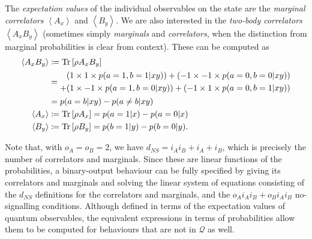 \documentclass[10pt, a4paper]{article}
\numberwithin{equation}{section} %
\theoremstyle{definition}
\theoremstyle{plain}
\newcommand{\?}{\mathrel{?}} %
\newcommand{\angleb}[1]{\left\langle #1 \right\rangle} %
\newcommand{\Tr}[2][]{\mathop{\mathrm{Tr}#1}\left[ #2 \right]} %
\newcommand{\Qs}{\mathcal{Q}}
\begin{document}
    The \emph{expectation values} of the individual observables on the state are the \emph{marginal correlators}  \(\angleb{A_x}\) and \(\angleb{B_y}\). We are also interested in the \emph{two-body correlators} \(\angleb{A_x B_y}\) (sometimes simply \emph{marginals} and \emph{correlators}, when the distinction from marginal probabilities is clear from context). These can be computed as
    \begin{align}
      \angleb{A_x B_y} &\coloneqq \Tr{\rho{A_x B_y}} \\
                       &= \begin{aligned}[c]
                         (1 \times 1 \times p(a=1,b=1|xy)) + (-1 \times -1 \times p(a=0,b=0|xy)) \\
                         + (1 \times -1 \times p(a=1,b=0|xy)) + (-1 \times 1 \times p(a=0,b=1|xy))
                       \end{aligned} \notag \\
                       &= p(a=b|xy) - p(a\neq b|xy) \\
      \angleb{A_x} &\coloneqq \Tr{\rho{A_x}} = p(a=1|x) - p(a=0|x) \\
      \angleb{B_y} &\coloneqq \Tr{\rho{B_y}} = p(b=1|y) - p(b=0|y).
    \end{align}

    Note that, with \(o_A = o_B = 2\), we have \(d_{NS} = {i_A}{i_B} + i_A + i_B\), which is precisely the number of correlators and marginals. Since these are linear functions of the probabilities, a binary-output behaviour can be fully specified by giving its correlators and marginals and solving the linear system of equations consisting of the \(d_{NS}\) definitions for the correlators and marginals, and the \(o_A i_A i_B + o_B i_A i_B\) no-signalling conditions. Although defined in terms of the expectation values of quantum observables, the equivalent expressions in terms of probabilities allow them to be computed for behaviours that are not in \(\Qs\) as well.
\end{document}
